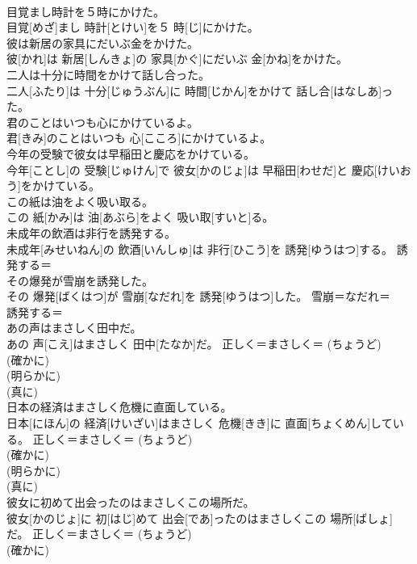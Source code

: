 \documentclass[8pt]{extreport}
\begin{document}
\begin{CJK}{UTF8}{min}
{\\	目覚まし時計を５時にかけた。	
\\	目覚[めざ]まし 時計[とけい]を５ 時[じ]にかけた。	
\\	彼は新居の家具にだいぶ金をかけた。	
\\	彼[かれ]は 新居[しんきょ]の 家具[かぐ]にだいぶ 金[かね]をかけた。	
\\	二人は十分に時間をかけて話し合った。	
\\	二人[ふたり]は 十分[じゅうぶん]に 時間[じかん]をかけて 話し合[はなしあ]った。	
\\	君のことはいつも心にかけているよ。	
\\	君[きみ]のことはいつも 心[こころ]にかけているよ。	
\\	今年の受験で彼女は早稲田と慶応をかけている。	
\\	今年[ことし]の 受験[じゅけん]で 彼女[かのじょ]は 早稲田[わせだ]と 慶応[けいおう]をかけている。	
\\	この紙は油をよく吸い取る。	
\\	この 紙[かみ]は 油[あぶら]をよく 吸い取[すいと]る。	
\\	未成年の飲酒は非行を誘発する。	
\\	未成年[みせいねん]の 飲酒[いんしゅ]は 非行[ひこう]を 誘発[ゆうはつ]する。	誘発する＝ 
\\	その爆発が雪崩を誘発した。	
\\	その 爆発[ばくはつ]が 雪崩[なだれ]を 誘発[ゆうはつ]した。	雪崩＝なだれ＝ 
\\	誘発する＝ 
\\	あの声はまさしく田中だ。	
\\	あの 声[こえ]はまさしく 田中[たなか]だ。	正しく＝まさしく＝ (ちょうど) 
\\	(確かに) 
\\	(明らかに) 
\\	(真に) 
\\	日本の経済はまさしく危機に直面している。	
\\	日本[にほん]の 経済[けいざい]はまさしく 危機[きき]に 直面[ちょくめん]している。	正しく＝まさしく＝ (ちょうど) 
\\	(確かに) 
\\	(明らかに) 
\\	(真に) 
\\	彼女に初めて出会ったのはまさしくこの場所だ。	
\\	彼女[かのじょ]に 初[はじ]めて 出会[であ]ったのはまさしくこの 場所[ばしょ]だ。	正しく＝まさしく＝ (ちょうど) 
\\	(確かに) 
}
\end{CJK}
\end{document}
